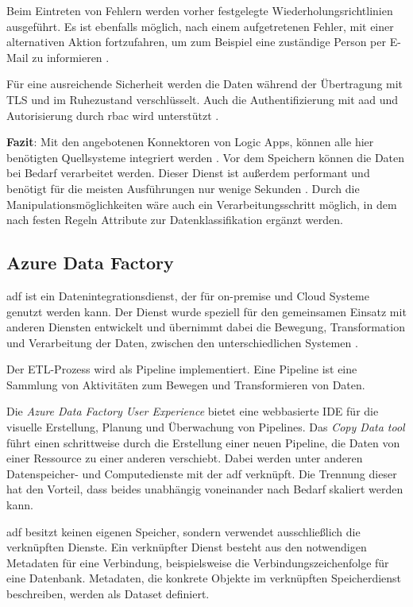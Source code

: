 Beim Eintreten von Fehlern werden vorher festgelegte Wiederholungsrichtlinien ausgeführt. Es ist ebenfalls möglich, nach einem aufgetretenen Fehler, mit einer alternativen Aktion fortzufahren, um zum Beispiel eine zuständige Person per E-Mail zu informieren \cite{fan_handle_2021}.

Für eine ausreichende Sicherheit werden die Daten während der Übertragung mit TLS und im Ruhezustand verschlüsselt. Auch die Authentifizierung mit \ac{aad} und Autorisierung durch \ac{rbac} wird unterstützt \cite{baldwin_azure_2021-1}. 

\textbf{Fazit}: Mit den angebotenen Konnektoren von Logic Apps, können alle hier benötigten Quellsysteme integriert werden \cite[vgl.][]{fan_verwaltete_2021}. Vor dem Speichern können die Daten bei Bedarf verarbeitet werden. Dieser Dienst ist außerdem performant und benötigt für die meisten Ausführungen nur wenige Sekunden \cite{bennett_enterprise_2021}. Durch die Manipulationsmöglichkeiten wäre auch ein Verarbeitungsschritt möglich, in dem nach festen Regeln Attribute zur Datenklassifikation ergänzt werden.

\subsection{Azure Data Factory} \label{sec:grundlagen:azure_dienste:dataFactory}
\ac{adf} ist ein Datenintegrationsdienst, der für on-premise und Cloud Systeme genutzt werden kann. Der Dienst wurde speziell für den gemeinsamen Einsatz mit anderen Diensten entwickelt und übernimmt dabei die Bewegung, Transformation und Verarbeitung der Daten, zwischen den unterschiedlichen Systemen \cite{klein_iot_2017}.

Der ETL-Prozess wird als Pipeline implementiert. Eine Pipeline ist eine Sammlung von Aktivitäten zum Bewegen und Transformieren von Daten. 

Die \textit{Azure Data Factory User Experience} bietet eine webbasierte IDE für die visuelle Erstellung, Planung und Überwachung von Pipelines. Das \textit{Copy Data tool} führt einen schrittweise durch die Erstellung einer neuen Pipeline, die Daten von einer Ressource zu einer anderen verschiebt. Dabei werden unter anderen Datenspeicher- und Computedienste mit der \ac{adf} verknüpft. Die Trennung dieser hat den Vorteil, dass beides unabhängig voneinander nach Bedarf skaliert werden kann.

\ac{adf} besitzt keinen eigenen Speicher, sondern verwendet ausschließlich die verknüpften Dienste. Ein verknüpfter Dienst besteht aus den notwendigen Metadaten für eine Verbindung, beispielsweise die Verbindungszeichenfolge für eine Datenbank. Metadaten, die konkrete Objekte im verknüpften Speicherdienst beschreiben, werden als Dataset definiert. 

